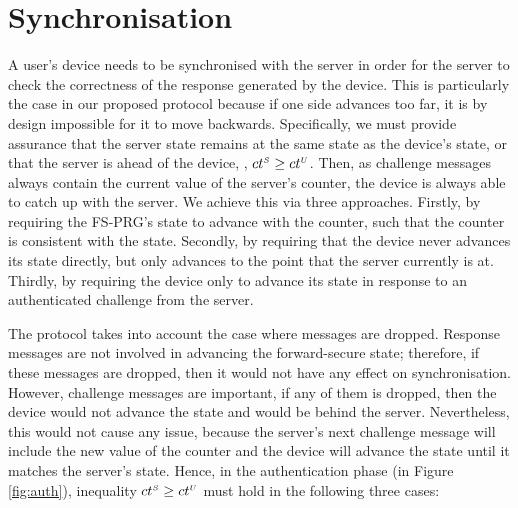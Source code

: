 


\section{Synchronisation}
\label{app:synchronisation}

A user's device needs to be synchronised with the server
in order for the server to check the correctness of the response generated by the device.
This is particularly the case in our proposed protocol because
if one side advances too far, it is by design impossible for it to
move backwards. Specifically, we must provide assurance that the server state remains at the same state as the device's state, or that the server is ahead of the device, \ie, ${ct}^{\scriptscriptstyle S} \geq {ct}^{\scriptscriptstyle U}$. Then, as challenge messages always contain the current value of the server's counter, the device is always able to catch up with the server. We achieve this via three approaches.  Firstly, by requiring the FS-PRG's state to advance with the counter, such that the counter is consistent with the state. Secondly, by requiring that the device never advances its state directly, but only advances to the point that the server currently is at. Thirdly, by requiring the device only to advance its state in response to an authenticated challenge from the server.%


The protocol takes into account the case where messages are dropped.
Response messages are not involved in advancing the forward-secure state; therefore, if these messages are dropped, then it would not have any effect on synchronisation. However, challenge messages are important, if any of them is dropped, then the device would not advance the state and would be behind the server. Nevertheless, this would not cause any issue, because the server's next challenge message will include the new value of the counter and the device will advance the state until it matches the server's state. Hence, in the authentication phase (in Figure \ref{fig:auth}), inequality ${ct}^{\scriptscriptstyle S} \geq {ct}^{\scriptscriptstyle U}$ must hold in the following three cases:  


